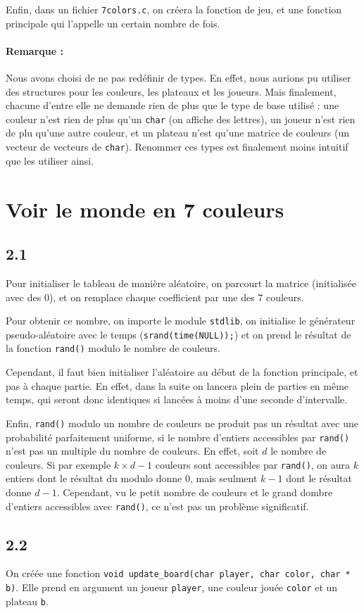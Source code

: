 \documentclass[12pt]{article}
\def\question#1{\subsection*{#1}}
\def\sec#1{\section{#1}}
\begin{document}
Enfin, dans un fichier \texttt{7colors.c}, on créera la fonction de jeu, et une fonction principale qui l'appelle un certain nombre de fois.

\paragraph{Remarque :} Nous avons choisi de ne pas redéfinir de types. En effet, nous aurions pu utiliser des structures pour les couleurs, les plateaux et les joueurs. Mais finalement, chacune d'entre elle ne demande rien de plus que le type de base utilisé : une couleur n'est rien de plus qu'un \texttt{char} (on affiche des lettres), un joueur n'est rien de plu qu'une autre couleur, et un plateau n'est qu'une matrice de couleurs (un vecteur de vecteurs de \texttt{char}). Renommer ces types est finalement moins intuitif que les utiliser ainsi.



\sec{Voir le monde en 7 couleurs}
\question{2.1} 
Pour initialiser le tableau de manière aléatoire, on parcourt la matrice (initialisée avec des 0), et on remplace chaque coefficient par une des 7 couleurs.

Pour obtenir ce nombre, on importe le module \texttt{stdlib}, on initialise le générateur pseudo-aléatoire avec le temps (\texttt{srand(time(NULL));}) et on prend le résultat de la fonction \texttt{rand()} modulo le nombre de couleurs.

Cependant, il faut bien initialiser l'aléatoire au début de la fonction principale, et pas à chaque partie. En effet, dans la suite on lancera plein de parties en même temps, qui seront donc identiques si lancées à moins d'une seconde d'intervalle.

Enfin, \texttt{rand()} modulo un nombre de couleurs ne produit pas un résultat avec une probabilité parfaitement uniforme, si le nombre d'entiers accessibles par \texttt{rand()} n'est pas un multiple du nombre de couleurs. En effet, soit $d$ le nombre de couleurs. Si par exemple $k\times d - 1$ couleurs sont accessibles par \texttt{rand()}, on aura $k$ entiers dont le résultat du modulo donne 0, mais seulment $k-1$ dont le résultat donne $d-1$.
Cependant, vu le petit nombre de couleurs et le grand dombre d'entiers accessibles avec \texttt{rand()}, ce n'est pas un problème significatif.

\question{2.2}
On créée une fonction \texttt{void update\_board(char player, char color, char * b)}. Elle prend en argument un joueur \texttt{player}, une couleur jouée \texttt{color} et un plateau \texttt{b}.
\end{document}
